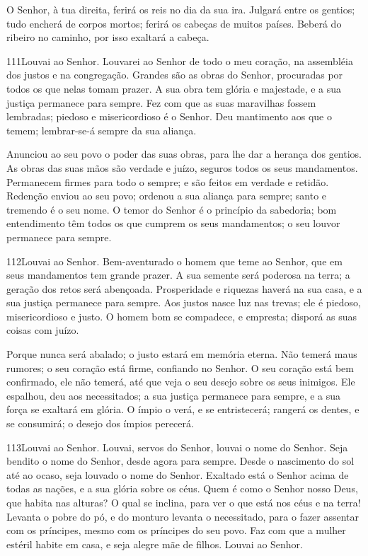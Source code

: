 O Senhor, à tua direita, ferirá os reis no dia da sua ira.
Julgará entre os gentios; tudo encherá de corpos mortos; ferirá
os cabeças de muitos países. Beberá do ribeiro no caminho, por
isso exaltará a cabeça.

\bigskip

\lettrine{111}{}Louvai ao Senhor. Louvarei ao Senhor de todo o
meu coração, na assembléia dos justos e na congregação. Grandes
são as obras do Senhor, procuradas por todos os que nelas tomam
prazer. A sua obra tem glória e majestade, e a sua justiça
permanece para sempre. Fez com que as suas maravilhas fossem
lembradas; piedoso e misericordioso é o Senhor. Deu mantimento
aos que o temem; lembrar-se-á sempre da sua aliança.

Anunciou ao seu povo o poder das suas obras, para lhe dar a
herança dos gentios. As obras das suas mãos são verdade e juízo,
seguros todos os seus mandamentos. Permanecem firmes para todo o
sempre; e são feitos em verdade e retidão. Redenção enviou ao
seu povo; ordenou a sua aliança para sempre; santo e tremendo é o
seu nome. O temor do Senhor é o princípio da sabedoria; bom
entendimento têm todos os que cumprem os seus mandamentos; o seu
louvor permanece para sempre.

\bigskip

\lettrine{112}{}Louvai ao Senhor. Bem-aventurado o homem que
teme ao Senhor, que em seus mandamentos tem grande prazer. A sua
semente será poderosa na terra; a geração dos retos será abençoada.
Prosperidade e riquezas haverá na sua casa, e a sua justiça
permanece para sempre. Aos justos nasce luz nas trevas; ele é
piedoso, misericordioso e justo. O homem bom se compadece, e
empresta; disporá as suas coisas com juízo.

Porque nunca será abalado; o justo estará em memória eterna.
Não temerá maus rumores; o seu coração está firme, confiando no
Senhor. O seu coração está bem confirmado, ele não temerá, até
que veja o seu desejo sobre os seus inimigos. Ele espalhou, deu
aos necessitados; a sua justiça permanece para sempre, e a sua força
se exaltará em glória. O ímpio o verá, e se entristecerá;
rangerá os dentes, e se consumirá; o desejo dos ímpios perecerá.

\bigskip

\lettrine{113}{}Louvai ao Senhor. Louvai, servos do Senhor,
louvai o nome do Senhor. Seja bendito o nome do Senhor, desde
agora para sempre. Desde o nascimento do sol até ao ocaso, seja
louvado o nome do Senhor. Exaltado está o Senhor acima de todas
as nações, e a sua glória sobre os céus. Quem é como o Senhor
nosso Deus, que habita nas alturas? O qual se inclina, para ver
o que está nos céus e na terra! Levanta o pobre do pó, e do
monturo levanta o necessitado, para o fazer assentar com os
príncipes, mesmo com os príncipes do seu povo. Faz com que a
mulher estéril habite em casa, e seja alegre mãe de filhos. Louvai
ao Senhor.

